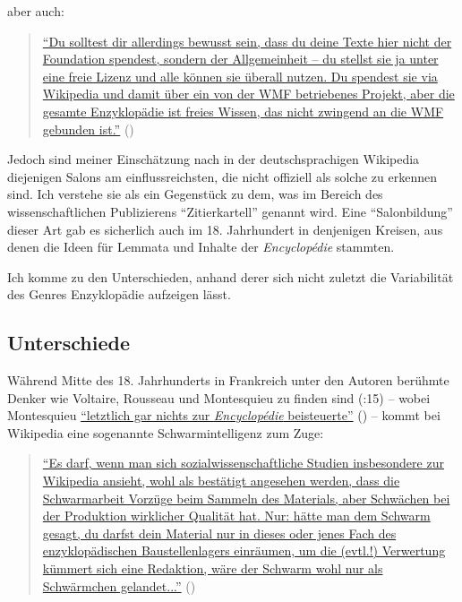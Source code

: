 \documentclass[fontsize=12pt]{scrartcl}
\begin{document}
aber auch: 

\singlespacing
\begin{quote}
\href{https://de.wikipedia.org/w/index.php?title=Benutzer_Diskussion:Grillenwaage\&diff=135281359\&oldid=135281196}{"`Du solltest dir al\-ler\-dings bewusst sein, dass du deine Texte \mbox{hier} nicht der Foundation spendest, sondern der Allgemeinheit -- du stellst sie ja unter eine freie Lizenz und alle k\"onnen sie \"uberall nutzen. Du spendest sie via Wi\-ki\-pe\-dia und damit \"uber ein von der WMF betriebenes Projekt, aber die gesamte Enzyklop\"adie ist freies Wissen, das nicht zwingend an die WMF gebunden ist."'} (\cite{UserGestumblindi2014})
\end{quote} 
\onehalfspacing 

Jedoch sind meiner Einsch\"atzung nach in der deutschspra\-chi\-gen Wi\-ki\-pe\-dia diejenigen Salons am einflussreichsten, die nicht offiziell als solche zu erkennen sind. Ich verstehe sie als ein Gegenst\"uck zu dem, was im \mbox{Bereich} des wissenschaftlichen Pu\-bli\-zierens "`Zitierkartell"' genannt wird. Eine "`Salonbildung"' dieser Art gab es sicherlich auch im 18. Jahrhundert in denjenigen Kreisen, aus denen die Ideen f\"ur Lemmata und Inhalte der \textit{Encyclop\'{e}die} stammten.

Ich komme zu den Unterschieden, anhand derer sich nicht zu\-letzt die Variabilit\"at des Genres Enzyklop\"adie aufzeigen l\"asst. 

\subsection{Unterschiede}
\label{subsec:4.2}
W\"ahrend Mitte des 18. Jahrhunderts in Frankreich unter den Autoren ber\"uhmte Denker\textsuperscript{\tiny *} wie Voltaire, Rousseau und Montesquieu zu finden sind (\cite{Lih2009}:15) -- wobei Montesquieu \href{http://www.nzz.ch/nachrichten/kultur/literatur_und_kunst/ordnung-und-unordnung-des-wissens-1.4941730}{"`letzt\-lich gar nichts zur \textit{Encyclop\'{e}die} beisteuerte"'} (\cite{Hirschi2010}) -- kommt bei Wi\-ki\-pe\-dia eine sogenannte Schwarmintelligenz zum Zuge: 

\singlespacing
\begin{quote}
\href{http://de.wikipedia.org/w/index.php?title=Benutzer_Diskussion:Simplicius\&diff=prev\&oldid=136386468}{"`Es darf, wenn man sich sozialwissenschaftliche Studien insbesondere zur Wi\-ki\-pe\-dia ansieht, wohl als best\"atigt angesehen werden, dass die Schwarmarbeit Vorz\"uge beim Sammeln des Materials, aber Schw\"achen bei der Produktion wirklicher Qualit\"at hat. Nur: h\"atte man dem Schwarm gesagt, du darfst dein Material nur in dieses oder jenes Fach des enzyklop\"adischen Baustellenlagers einr\"aumen, um die (evtl.!) Verwertung k\"ummert sich eine Redaktion, w\"are der Schwarm wohl nur als Schw\"arm\-chen gelandet..."'} (\cite{User93.184.136.22014})
\end{quote} 
\onehalfspacing 
\end{document}
